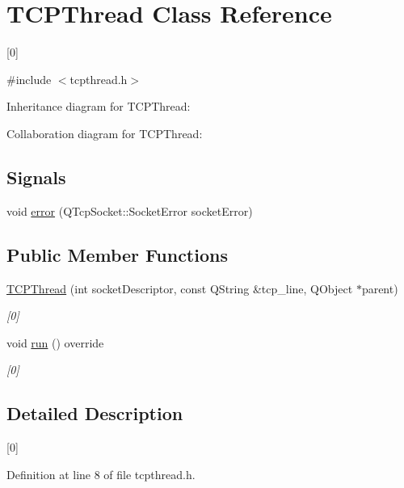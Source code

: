 \hypertarget{classTCPThread}{}\section{T\+C\+P\+Thread Class Reference}
\label{classTCPThread}


\mbox{[}0\mbox{]}  




{\ttfamily \#include $<$tcpthread.\+h$>$}



Inheritance diagram for T\+C\+P\+Thread\+:


Collaboration diagram for T\+C\+P\+Thread\+:
\subsection*{Signals}
\begin{DoxyCompactItemize}
\item 
void \hyperlink{classTCPThread_a582a30cfbf6105741b2638990271863f}{error} (Q\+Tcp\+Socket\+::\+Socket\+Error socket\+Error)
\end{DoxyCompactItemize}
\subsection*{Public Member Functions}
\begin{DoxyCompactItemize}
\item 
\hyperlink{classTCPThread_a19f6df426c668c28309d294d8764a041}{T\+C\+P\+Thread} (int socket\+Descriptor, const Q\+String \&tcp\+\_\+line, Q\+Object $\ast$parent)
\begin{DoxyCompactList}\small\item\em \mbox{[}0\mbox{]} \end{DoxyCompactList}\item 
void \hyperlink{classTCPThread_a3f78809c75e6355ec90e05c47fd2f6e6}{run} () override
\begin{DoxyCompactList}\small\item\em \mbox{[}0\mbox{]} \end{DoxyCompactList}\end{DoxyCompactItemize}


\subsection{Detailed Description}
\mbox{[}0\mbox{]} 

Definition at line 8 of file tcpthread.\+h.



